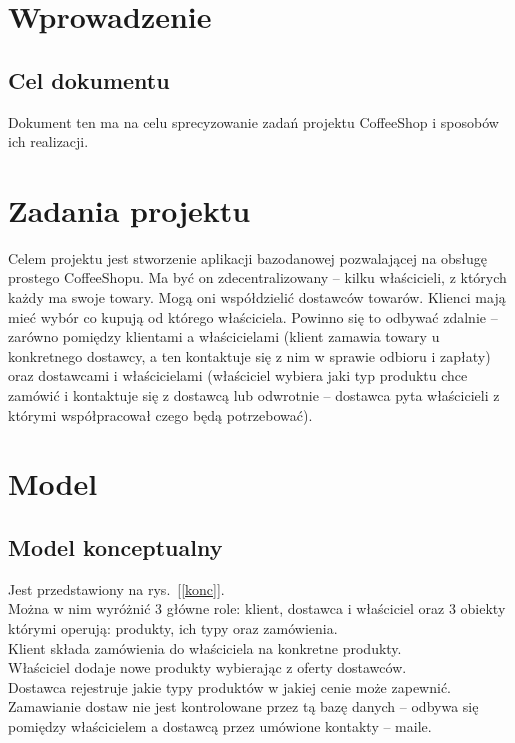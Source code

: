 


\tableofcontents
\clearpage
\section{Wprowadzenie}
\subsection{Cel dokumentu}
Dokument ten ma na celu sprecyzowanie zadań projektu CoffeeShop i sposobów ich realizacji.
\section{Zadania projektu}
Celem projektu jest stworzenie aplikacji bazodanowej pozwalającej na obsługę prostego CoffeeShopu. Ma być on zdecentralizowany -- kilku właścicieli, z których każdy ma swoje towary. Mogą oni współdzielić dostawców towarów. Klienci mają mieć wybór co kupują od którego właściciela. 
Powinno się to odbywać zdalnie -- zarówno pomiędzy klientami a właścicielami (klient zamawia towary u konkretnego dostawcy, a ten kontaktuje się z nim w sprawie odbioru i zapłaty) oraz dostawcami i właścicielami (właściciel wybiera jaki typ produktu chce zamówić i kontaktuje się z dostawcą lub odwrotnie -- dostawca pyta właścicieli z którymi współpracował czego będą potrzebować).
\section{Model}
\subsection{Model konceptualny}
Jest przedstawiony na rys.~[\ref{konc}].\\
Można w nim wyróżnić 3 główne role: klient, dostawca i właściciel oraz 3 obiekty którymi operują: produkty, ich typy oraz zamówienia. \\
Klient składa zamówienia do właściciela na konkretne produkty.\\
Właściciel dodaje nowe produkty wybierając z oferty dostawców.\\
Dostawca rejestruje jakie typy produktów w jakiej cenie może zapewnić.\\
Zamawianie dostaw nie jest kontrolowane przez tą bazę danych -- odbywa się pomiędzy właścicielem a dostawcą przez umówione kontakty -- maile.
